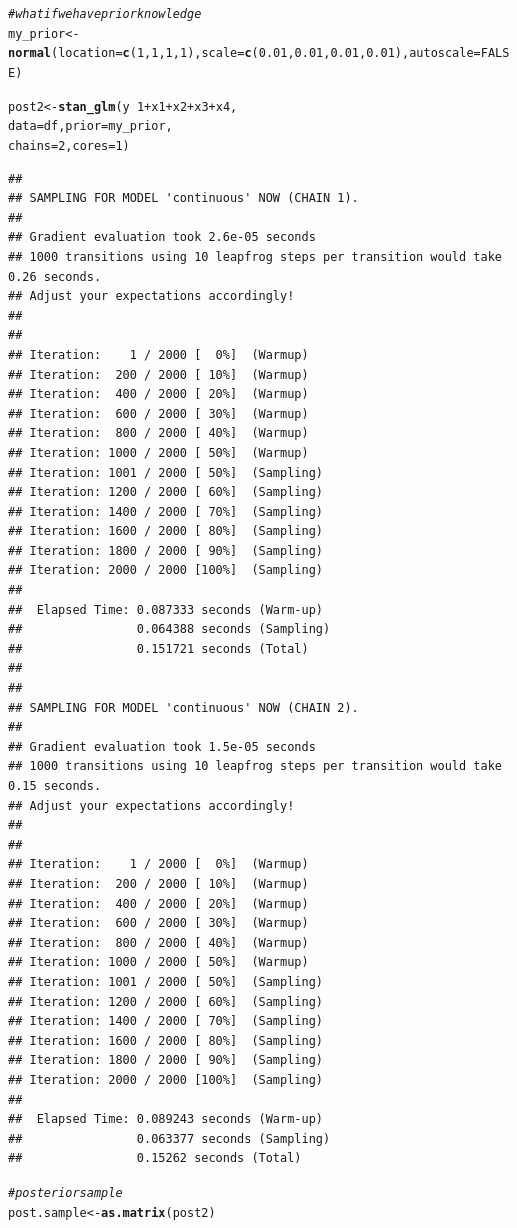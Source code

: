\documentclass[11pt,a4paper,twoside]{book}\usepackage[]{graphicx}\usepackage[]{color}
\makeatletter
\newcommand{\hlnum}[1]{\textcolor[rgb]{0.686,0.059,0.569}{#1}}%
\newcommand{\hlcom}[1]{\textcolor[rgb]{0.678,0.584,0.686}{\textit{#1}}}%
\newcommand{\hlopt}[1]{\textcolor[rgb]{0,0,0}{#1}}%
\newcommand{\hlstd}[1]{\textcolor[rgb]{0.345,0.345,0.345}{#1}}%
\newcommand{\hlkwb}[1]{\textcolor[rgb]{0.69,0.353,0.396}{#1}}%
\newcommand{\hlkwc}[1]{\textcolor[rgb]{0.333,0.667,0.333}{#1}}%
\newcommand{\hlkwd}[1]{\textcolor[rgb]{0.737,0.353,0.396}{\textbf{#1}}}%
\newenvironment{kframe}{%
 \def\at@end@of@kframe{}%
 \ifinner\ifhmode%
  \def\at@end@of@kframe{\end{minipage}}%
  \begin{minipage}{\columnwidth}%
 \fi\fi%
 \def\FrameCommand##1{\hskip\@totalleftmargin \hskip-\fboxsep
 \colorbox{shadecolor}{##1}\hskip-\fboxsep
     \hskip-\linewidth \hskip-\@totalleftmargin \hskip\columnwidth}%
 \MakeFramed {\advance\hsize-\width
   \@totalleftmargin\z@ \linewidth\hsize
   \@setminipage}}%
 {\par\unskip\endMakeFramed%
 \at@end@of@kframe}
\newenvironment{knitrout}{}{} %
\makeatother
\begin{document}
\begin{knitrout}
\begin{kframe}
\begin{alltt}
\hlcom{#what if we have prior knowledge}
\hlstd{my_prior} \hlkwb{<-} \hlkwd{normal}\hlstd{(}\hlkwc{location} \hlstd{=} \hlkwd{c}\hlstd{(}\hlnum{1}\hlstd{,} \hlnum{1}\hlstd{,}\hlnum{1}\hlstd{,}\hlnum{1}\hlstd{),} \hlkwc{scale} \hlstd{=} \hlkwd{c}\hlstd{(}\hlnum{0.01}\hlstd{,} \hlnum{0.01}\hlstd{,}\hlnum{0.01}\hlstd{,}\hlnum{0.01}\hlstd{),} \hlkwc{autoscale} \hlstd{=} \hlnum{FALSE}\hlstd{)}

\hlstd{post2} \hlkwb{<-} \hlkwd{stan_glm}\hlstd{(y} \hlopt{~} \hlnum{1} \hlopt{+} \hlstd{x1} \hlopt{+} \hlstd{x2} \hlopt{+} \hlstd{x3} \hlopt{+} \hlstd{x4,}
                  \hlkwc{data} \hlstd{= df,} \hlkwc{prior} \hlstd{= my_prior,}
                  \hlkwc{chains} \hlstd{=} \hlnum{2}\hlstd{,} \hlkwc{cores} \hlstd{=} \hlnum{1}\hlstd{)}
\end{alltt}
\begin{verbatim}
## 
## SAMPLING FOR MODEL 'continuous' NOW (CHAIN 1).
## 
## Gradient evaluation took 2.6e-05 seconds
## 1000 transitions using 10 leapfrog steps per transition would take 0.26 seconds.
## Adjust your expectations accordingly!
## 
## 
## Iteration:    1 / 2000 [  0%]  (Warmup)
## Iteration:  200 / 2000 [ 10%]  (Warmup)
## Iteration:  400 / 2000 [ 20%]  (Warmup)
## Iteration:  600 / 2000 [ 30%]  (Warmup)
## Iteration:  800 / 2000 [ 40%]  (Warmup)
## Iteration: 1000 / 2000 [ 50%]  (Warmup)
## Iteration: 1001 / 2000 [ 50%]  (Sampling)
## Iteration: 1200 / 2000 [ 60%]  (Sampling)
## Iteration: 1400 / 2000 [ 70%]  (Sampling)
## Iteration: 1600 / 2000 [ 80%]  (Sampling)
## Iteration: 1800 / 2000 [ 90%]  (Sampling)
## Iteration: 2000 / 2000 [100%]  (Sampling)
## 
##  Elapsed Time: 0.087333 seconds (Warm-up)
##                0.064388 seconds (Sampling)
##                0.151721 seconds (Total)
## 
## 
## SAMPLING FOR MODEL 'continuous' NOW (CHAIN 2).
## 
## Gradient evaluation took 1.5e-05 seconds
## 1000 transitions using 10 leapfrog steps per transition would take 0.15 seconds.
## Adjust your expectations accordingly!
## 
## 
## Iteration:    1 / 2000 [  0%]  (Warmup)
## Iteration:  200 / 2000 [ 10%]  (Warmup)
## Iteration:  400 / 2000 [ 20%]  (Warmup)
## Iteration:  600 / 2000 [ 30%]  (Warmup)
## Iteration:  800 / 2000 [ 40%]  (Warmup)
## Iteration: 1000 / 2000 [ 50%]  (Warmup)
## Iteration: 1001 / 2000 [ 50%]  (Sampling)
## Iteration: 1200 / 2000 [ 60%]  (Sampling)
## Iteration: 1400 / 2000 [ 70%]  (Sampling)
## Iteration: 1600 / 2000 [ 80%]  (Sampling)
## Iteration: 1800 / 2000 [ 90%]  (Sampling)
## Iteration: 2000 / 2000 [100%]  (Sampling)
## 
##  Elapsed Time: 0.089243 seconds (Warm-up)
##                0.063377 seconds (Sampling)
##                0.15262 seconds (Total)
\end{verbatim}
\begin{alltt}
\hlcom{#posterior sample}
\hlstd{post.sample} \hlkwb{<-} \hlkwd{as.matrix}\hlstd{(post2)}


\end{alltt}
\end{kframe}
\end{knitrout}
\end{document}
